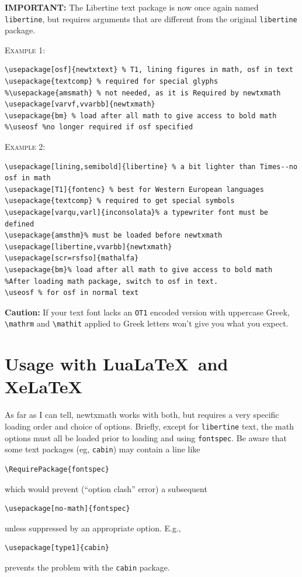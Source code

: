 \documentclass[\fsc]{article}
\theoremstyle{oldplain}
\theoremstyle{plain}
\begin{document}
\textbf{IMPORTANT:} The Libertine text package is now once again named {\tt libertine}, but requires arguments that are different from the original {\tt libertine} package.

\textsc{Example 1:}
\begin{verbatim}
\usepackage[osf]{newtxtext} % T1, lining figures in math, osf in text
\usepackage{textcomp} % required for special glyphs
%\usepackage{amsmath} % not needed, as it is Required by newtxmath
\usepackage[varvf,vvarbb]{newtxmath}
\usepackage{bm} % load after all math to give access to bold math
%\useosf %no longer required if osf specified
\end{verbatim}
\textsc{Example 2:}
\begin{verbatim}
\usepackage[lining,semibold]{libertine} % a bit lighter than Times--no osf in math
\usepackage[T1]{fontenc} % best for Western European languages
\usepackage{textcomp} % required to get special symbols
\usepackage[varqu,varl]{inconsolata}% a typewriter font must be defined
\usepackage{amsthm}% must be loaded before newtxmath
\usepackage[libertine,vvarbb]{newtxmath}
\usepackage[scr=rsfso]{mathalfa}
\usepackage{bm}% load after all math to give access to bold math
%After loading math package, switch to osf in text.
\useosf % for osf in normal text
\end{verbatim}

\textbf{Caution:} If your text font lacks an {\tt OT1} encoded version with uppercase Greek, \verb|\mathrm| and \verb|\mathit| applied to Greek letters won't give you what you expect.
\section{Usage with Lua\LaTeX\ and Xe\LaTeX}
As far as I can tell, \textsf{newtxmath} works with both, but requires a very specific loading order and choice of options. Briefly, except for {\tt libertine} text, the math options must all be loaded prior to loading and using {\tt fontspec}. Be aware that some text packages (eg, {\tt cabin}) may contain a line like
\begin{verbatim}
\RequirePackage{fontspec}
\end{verbatim}
which would prevent (``option clash'' error) a subsequent 
\begin{verbatim}
\usepackage[no-math]{fontspec}
\end{verbatim}
unless suppressed by an appropriate option. E.g., 
\begin{verbatim}
\usepackage[type1]{cabin}
\end{verbatim}
prevents the problem with the {\tt cabin} package.
\end{document}

